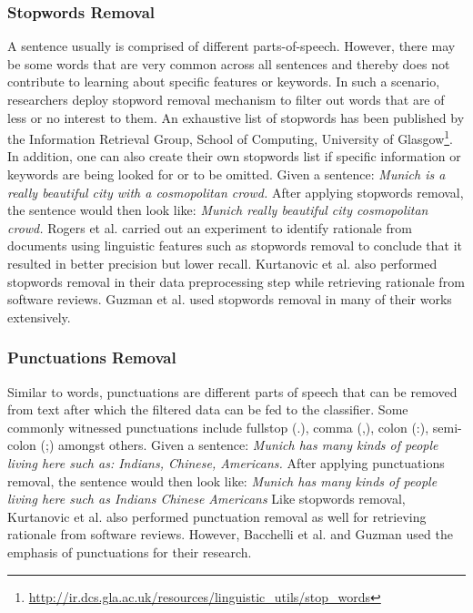 \documentclass[a4paper,12pt,twoside]{report}
\begin{document}
\subsubsection{Stopwords Removal}
A sentence usually is comprised of different parts-of-speech. However, there may be some words that are very common across all sentences and thereby does not contribute to learning about specific features or keywords. In such a scenario, researchers deploy stopword removal mechanism to filter out words that are of less or no interest to them. An exhaustive list of stopwords has been published by the Information Retrieval Group, School of Computing, University of Glasgow\footnote{\url{http://ir.dcs.gla.ac.uk/resources/linguistic_utils/stop_words}}. In addition, one can also create their own stopwords list if specific information or keywords are being looked for or to be omitted. 
\bigbreak
Given a sentence: \textit{Munich is a really beautiful city with a cosmopolitan crowd.} 
\bigbreak
After applying stopwords removal, the sentence would then look like: \textit{Munich really beautiful city cosmopolitan crowd.} 
\bigbreak
Rogers et al.\cite{Rogers2012} carried out an experiment to identify rationale from documents using linguistic features such as stopwords removal to conclude that it resulted in better precision but lower recall. Kurtanovic et al.\cite{Kurtanovic2017} also performed stopwords removal in their data preprocessing step while retrieving rationale from software reviews. Guzman et al.\cite{Guzman2017}\cite{Guzman2017a}\cite{Guzman2016}\cite{Guzman2014} used stopwords removal in many of their works extensively.

\subsubsection{Punctuations Removal}
Similar to words, punctuations are different parts of speech that can be removed from text after which the filtered data can be fed to the classifier. Some commonly witnessed punctuations include fullstop (.), comma (,), colon (:), semi-colon (;) amongst others. 
\bigbreak
Given a sentence: \textit{Munich has many kinds of people living here such as: Indians, Chinese, Americans.}
\bigbreak
After applying punctuations removal, the sentence would then look like: \textit{Munich has many kinds of people living here such as Indians Chinese Americans}
\bigbreak
Like stopwords removal, Kurtanovic et al.\cite{Kurtanovic2017} also performed punctuation removal as well for retrieving rationale from software reviews. However, Bacchelli et al.\cite{Bacchelli2012} and Guzman\cite{Guzman2015} used the emphasis of punctuations for their research. 
\end{document}
